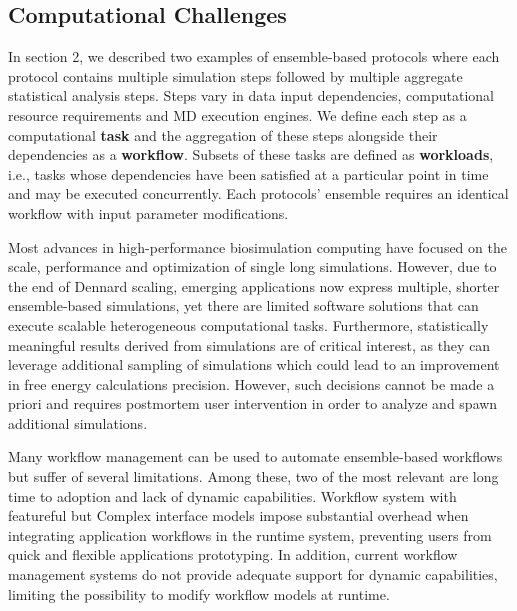 \subsection{Computational Challenges}

In section 2, we described two examples of ensemble-based protocols where
each protocol contains multiple simulation steps followed by multiple
aggregate statistical analysis steps. Steps vary in data input dependencies,
computational resource requirements and MD execution engines. We define each
step as a computational \textbf{task} and the aggregation of these steps
alongside their dependencies as a \textbf{workflow}. Subsets of these tasks
are defined as \textbf{workloads}, i.e., tasks whose dependencies have been
satisfied at a particular point in time and may be executed concurrently.
Each protocols' ensemble requires an identical workflow with input parameter
modifications.

Most advances in high-performance biosimulation computing have focused on the
scale, performance and optimization of single long simulations. However, due
to the end of Dennard scaling, emerging applications now express multiple,
shorter ensemble-based simulations, yet there are limited software solutions
that can execute scalable heterogeneous computational tasks. Furthermore,
statistically meaningful results derived from simulations are of critical
interest, as they can leverage additional sampling of simulations which could
lead to an improvement in free energy calculations precision. However, such
decisions cannot be made a priori and requires postmortem user intervention
in order to analyze and spawn additional simulations.


Many workflow management can be used to automate ensemble-based workflows but
suffer of several limitations. Among these, two of the most relevant are long time to adoption and lack of dynamic capabilities. 
Workflow system with featureful but Complex interface models impose
substantial overhead when integrating application workflows in the runtime
system, preventing users from quick and flexible applications prototyping.
In addition, current workflow management systems do not provide adequate
support for dynamic capabilities, limiting the possibility to modify workflow
models at runtime.

